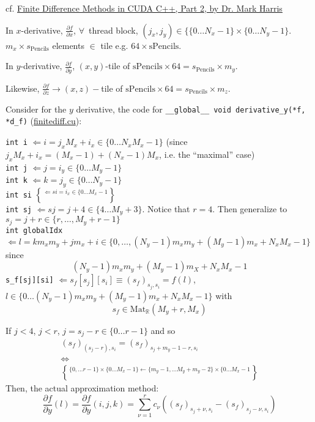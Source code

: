 \documentclass[10pt]{amsart}
\begin{document}
\begin{multicols*}{2}
cf. \href{https://devblogs.nvidia.com/parallelforall/finite-difference-methods-cuda-c-part-2/}{Finite Difference Methods in CUDA C++, Part 2, by Dr. Mark Harris}

In $x$-derivative, $\frac{ \partial f}{ \partial x}$, $\forall \, $ thread block, $(j_x,j_y) \in \lbrace \lbrace 0 \dots N_x - 1 \rbrace \times \lbrace 0 \dots N_y-1 \rbrace$.  $m_x\times s_{\text{Pencils}}$ elements $\in$ tile e.g. $64 \times \text{sPencils}$.

In $y$-derivative, $\frac{ \partial f}{ \partial y}$, $(x,y)$-tile of $\text{sPencils} \times 64 = s_{\text{Pencils}} \times m_y$.

Likewise, $\frac{ \partial f}{ \partial z} \to (x,z)-$tile of $\text{sPencils} \times 64 = s_{\text{Pencils}} \times m_z$.  

Consider for the $y$ derivative, the code for \verb|__global__ void derivative_y(*f, *d_f)| (\href{https://github.com/ernestyalumni/CompPhys/blob/master/moreCUDA/finitediff.cu}{finitediff.cu}):

\verb|int i| $\Longleftarrow i = j_x M_x + i_x \in \lbrace 0 \dots N_xM_x-1\rbrace$ (since $j_xM_x + i_x = (M_x-1)+(N_x-1)M_x$, i.e. the ``maximal'' case) \\
\verb|int j| $\Longleftarrow j = i_y \in \lbrace 0 \dots M_y-1 \rbrace$ \\
\verb|int k| $\Longleftarrow k = j_y \in \lbrace 0 \dots N_y-1 \rbrace$ \\
\verb|int si| $\Longleftarrow si = i_x \in \lbrace 0 \dots M_x-1\brace$ \\
\verb|int sj| $\Longleftarrow sj = j+4 \in \lbrace 4 \dots M_y+3 \rbrace$.  Notice that $r=4$.  Then generalize to $s_j = j + r\in \lbrace r, \dots , M_y + r-1 \rbrace$ \\
\verb|int globalIdx| $\Longleftarrow l = km_xm_y + jm_x + i\in \lbrace 0 , \dots , (N_y -1)m_xm_y + (M_y-1)m_x + N_xM_x -1 \rbrace$ since
\[
(N_y-1)m_xm_y + (M_y-1)m_X + N_xM_x -1
\]
\verb|s_f[sj][si]| $\Longleftarrow s_f[s_j][s_i] \equiv (s_f)_{s_j,s_i} = f(l)$, $l\in \lbrace 0 \dots (N_y - 1)m_xm_y + (M_y-1)m_x + N_xM_x -1 \rbrace$ with
\[
s_f\in \text{Mat}_{\mathbb{R}}(M_y + r, M_x)
\]

If $j< 4$, $j<r$, $j = s_j-r \in \lbrace 0 \dots r-1 \rbrace$ and so
\[
\begin{gathered}
(s_f)_{ (s_j-r), s_i } = (s_f)_{ s_j + m_y - 1-r, s_i} \\ 
  \Longleftrightarrow \\
  \lbrace 0 , \dots r-1\rbrace \times \lbrace 0 \dots M_x-1\rbrace \xleftarrow{} \lbrace m_y - 1, \dots M_y + m_y -2 \rbrace \times \lbrace 0 \dots M_x - 1 \brace
  \end{gathered}
\]
Then, the actual approximation method:
\[
\frac{ \partial f}{ \partial y}(l) = \frac{ \partial f}{ \partial y}(i,j,k) = \sum_{\nu =1}^r c_{\nu} ((s_f)_{s_j + \nu, s_i} - (s_f)_{s_j-\nu,s_i} )
\]


\end{multicols*}
\end{document}
